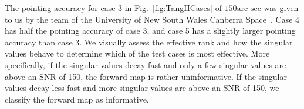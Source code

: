 The pointing accuracy for case 3 in Fig.~\ref{fig:TangHCases} of $150\text{arc sec}$ was given to us by the team of the University of New South Wales Canberra Space~\cite{CubeSatInternal}.
Case 4 has half the pointing accuracy of case 3, and case 5 has a slightly larger pointing accuracy than case 3.
We visually assess the effective rank and how the singular values behave to determine which of the test cases is most effective.
More specifically, if the singular values decay fast and only a few singular values are above an SNR of 150, the forward map is rather uninformative.
If the singular values decay less fast and more singular values are above an SNR of 150, we classify the forward map as informative.

